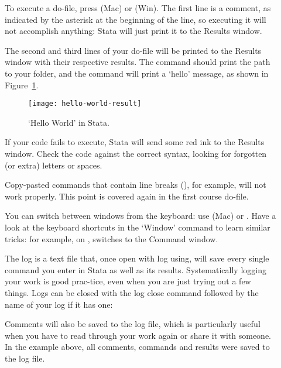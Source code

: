 \begin{description}
 		\item[]

		To execute a do-file, press  (Mac) or  (Win). The first line is a comment, as indicated by the asterisk at the beginning of the line, so executing it will not accomplish anything: Stata will just print it to the Results window.%
  
The second and third lines of your do-file will be printed to the Results window with their respective results. The  command should print the path to your \SRQM folder, and the  command will print a `hello' message, as shown in Figure~\ref{fig:hello-world-result}.
  
\begin{figure}%
\texttt{[image: hello-world-result]}
\caption{`Hello World' in Stata.}
\label{fig:hello-world-result}
\end{figure}

 If your code fails to execute, Stata will send some red ink to the Results window. Check the code against the correct syntax, looking for forgotten (or extra) letters or spaces.
  
 Copy-pasted commands that contain line breaks (\cmd{///}), for example, will not work properly. This point is covered again in the first course do-file.

  
You can switch between windows from the keyboard: use  (Mac) or . Have a look at the keyboard shortcuts in the `Window' command to learn similar tricks: for example, on \OSX,  switches to the Command window.
  

The log is a text file that, once open with log using, will save every single command you enter in Stata as well as its results. Systematically logging your work is good prac-tice, even when you are just trying out a few things. Logs can be closed with the log close command followed by the name of your log if it has one:


Comments will also be saved to the log file, which is particularly useful when you have to read through your work again or share it with someone. In the example above, all comments, commands and results were saved to the log file.


\end{description}
